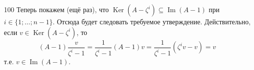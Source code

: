 \documentclass[12pt,a4paper]{article}
\DeclareMathOperator{\Img}{Im}
\DeclareMathOperator{\Ker}{Ker}
\begin{document}
\begin{problem}{100}
        Теперь покажем (ещё раз), что $\Ker(A - \zeta^i) \subseteq \Img(A - 1)$ при $i \in \{1; \dots; n-1\}$. Отсюда будет следовать требуемое утверждение. Действительно, если $v \in \Ker(A - \zeta^i)$, то
        \[(A-1)\frac{v}{\zeta^i - 1} = \frac{1}{\zeta^i - 1}(A-1)v = \frac{1}{\zeta^i - 1}(\zeta^i v - v) = v\]
        т.е. $v \in \Img(A - 1)$.
    \end{problem}
\end{document}
